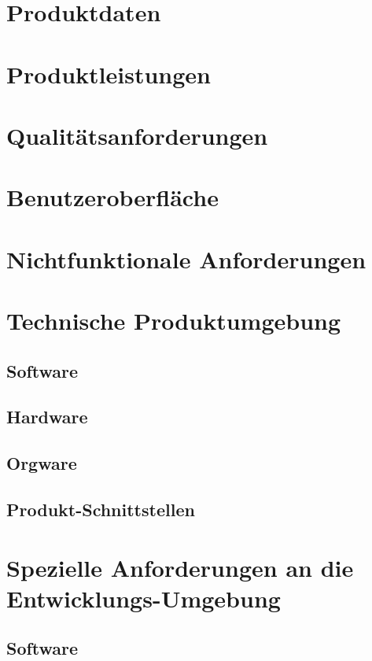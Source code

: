 \documentclass[12pt, a4paper]{article}
\begin{document}
\section{Produktdaten}
\pagebreak

\section{Produktleistungen}
\pagebreak

\section{Qualitätsanforderungen}
\pagebreak

\section{Benutzeroberfläche}
\pagebreak

\section{Nichtfunktionale Anforderungen}
\pagebreak

\section{Technische Produktumgebung}
\subsection{Software}
\subsection{Hardware}
\subsection{Orgware}
\subsection{Produkt-Schnittstellen}
\pagebreak

\section{Spezielle Anforderungen an die Entwicklungs-Umgebung}
\subsection{Software}
\end{document}
